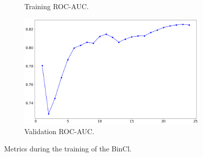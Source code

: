 \documentclass[a4paper,10pt]{article}
\begin{document}
\begin{figure}[p]
{\begin{subfigure}[b]{0.6\textwidth}
			\caption{Training ROC-AUC.}
			\label{fig:bc_train_rocauc}
		\end{subfigure}%
		\begin{subfigure}[b]{0.6\textwidth}
			\centering
			\includegraphics[width=\textwidth]{bc_val_rocauc.png}
			\caption{Validation ROC-AUC.}
			\label{fig:bc_val_rocauc}
		\end{subfigure}
	}
	\caption{Metrics during the training of the BinCl.}
	\label{fig:bc_train_metrics}
\end{figure}
\end{document}
